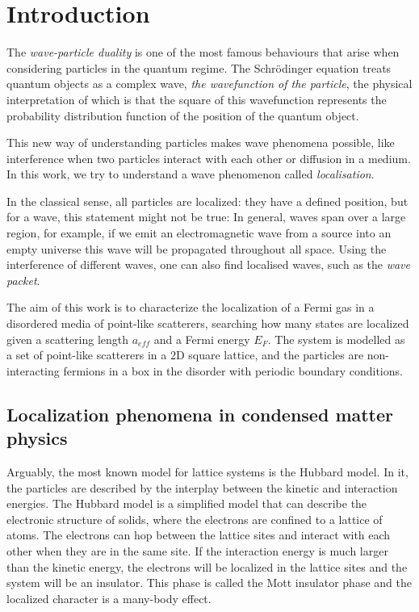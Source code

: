 \clearpage
\newpage
\section{Introduction}

The \textit{wave-particle duality} is one of the most famous behaviours that arise when considering particles in the quantum regime. The Schrödinger equation treats quantum objects as a complex wave, \textit{the wavefunction of the particle}, the physical interpretation of which is that the square of this wavefunction represents the probability distribution function of the position of the quantum object.

This new way of understanding particles makes wave phenomena possible, like interference when two particles interact with each other or diffusion in a medium. In this work, we try to understand a wave phenomenon called \textit{localisation}. 

In the classical sense, all particles are localized: they have a defined position, but for a wave, this statement might not be true: In general, waves span over a large region, for example, if we emit an electromagnetic wave from a source into an empty universe this wave will be propagated throughout all space. Using the interference of different waves, one can also find localised waves, such as the \textit{wave packet}.

The aim of this work is to characterize the localization of a Fermi gas in a disordered media of point-like scatterers, searching how many states are localized given a scattering length $a_{eff}$ and a Fermi energy $E_F$. The system is modelled as a set of point-like scatterers in a 2D square lattice, and the particles are non-interacting fermions in a box in the disorder with periodic boundary conditions. 

\subsection{Localization phenomena in condensed matter physics}

Arguably, the most known model for lattice systems is the Hubbard model. In it, the particles are described by the interplay between the kinetic and interaction energies. The Hubbard model is a simplified model that can describe the electronic structure of solids, where the electrons are confined to a lattice of atoms. The electrons can hop between the lattice sites and interact with each other when they are in the same site. If the interaction energy is much larger than the kinetic energy, the electrons will be localized in the lattice sites and the system will be an insulator. This phase is called the Mott insulator phase and the localized character is a many-body effect.  

